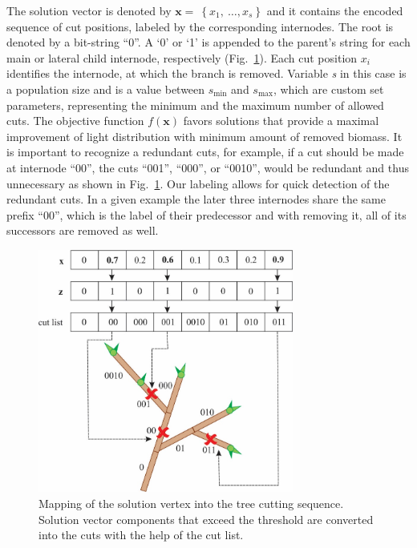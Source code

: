 The solution vector is denoted by
\(\mathbf{x} = \ \left\{ x_{1},\ \ldots,x_{s} \right\}\) and it contains
the encoded sequence of cut positions, labeled by the corresponding
internodes. The root is denoted by a bit-string ``0''. A `0' or `1' is
appended to the parent's string for each main or lateral child
internode, respectively (Fig.~\ref{fig:my_figure2}). Each cut position \(x_{i}\)
identifies the internode, at which the branch is removed. Variable
\emph{s} in this case is a population size and is a value between
\(s_{\mathrm{\min}}\) and \(s_{\mathrm{\max}}\), which are custom set
parameters, representing the minimum and the maximum number of allowed
cuts. The objective function \(f(\mathbf{x})\) favors solutions that
provide a maximal improvement of light distribution with minimum amount
of removed biomass. It is important to recognize a redundant cuts,
for example, if a cut should be made at internode ``00'', the cuts
``001'', ``000'', or ``0010'', would be redundant and thus unnecessary
as shown in Fig.~\ref{fig:my_figure2}. Our labeling allows for quick detection of the
redundant cuts. In a given example the later three internodes share the
same prefix ``00'', which is the label of their predecessor and with
removing it, all of its successors are removed as well.
\begin{figure}[hbt]
    \centering
    \includegraphics[width=3.3in]{figs/image2.jpeg}
    \caption{Mapping of the solution vertex into the tree cutting
sequence. Solution vector components that exceed the threshold are
converted into the cuts with the help of the cut list.}
    \label{fig:my_figure2}
\end{figure}

